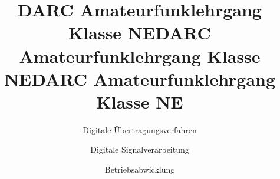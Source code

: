 \documentclass[aspectratio = 169]{beamer}
\begin{document}
\title{DARC Amateurfunklehrgang Klasse NE}
\author{Digitale Übertragungsverfahren}
\begin{frame}
\maketitle
\end{frame}
















\title{DARC Amateurfunklehrgang Klasse NE}
\author{Digitale Signalverarbeitung}
\begin{frame}
\maketitle
\end{frame}


\title{DARC Amateurfunklehrgang Klasse NE}
\author{Betriebsabwicklung}
\begin{frame}
\maketitle
\end{frame}






\end{document}
